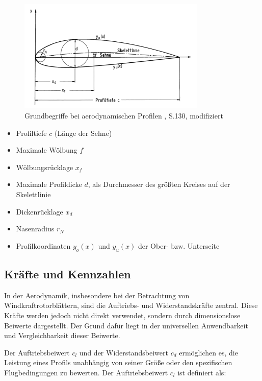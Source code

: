 \begin{figure}[htbp] %
    \centering %
    \includegraphics[width=0.8\textwidth]{figures/profil_begriffe.png} %
    \caption{Grundbegriffe bei aerodynamischen Profilen \cite{hau_physikalische_2016}, S.130, modifiziert} %
    \label{fig:profil_begriffe} %
\end{figure}

\begin{itemize}
    \item Profiltiefe \( c \) (Länge der Sehne)
    \item Maximale Wölbung \( f \)
    \item Wölbungsrücklage \( x_f \)
    \item Maximale Profildicke \( d \), als Durchmesser des größten Kreises auf der Skelettlinie
    \item Dickenrücklage \( x_d \)
    \item Nasenradius \( r_N \)
    \item Profilkoordinaten \( y_o(x) \) und \( y_u(x) \) der Ober- bzw. Unterseite
\end{itemize}

\subsection{Kräfte und Kennzahlen}

In der Aerodynamik, insbesondere bei der Betrachtung von Windkraftrotorblättern, sind die Auftriebs- und Widerstandskräfte zentral. Diese Kräfte werden jedoch nicht direkt verwendet, sondern durch dimensionslose Beiwerte dargestellt. Der Grund dafür liegt in der universellen Anwendbarkeit und Vergleichbarkeit dieser Beiwerte.

Der Auftriebsbeiwert \( c_l \) und der Widerstandsbeiwert \( c_d \) ermöglichen es, die Leistung eines Profils unabhängig von seiner Größe oder den spezifischen Flugbedingungen zu bewerten. Der Auftriebsbeiwert \( c_l \) ist definiert als:

